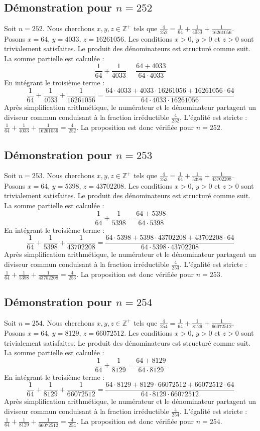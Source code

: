 \documentclass[11pt,a4paper]{article}
\begin{document}
\subsection{Démonstration pour $n = 252$}
Soit $n = 252$. Nous cherchons $x, y, z \in \mathbb{Z}^{+}$ tels que $\frac{4}{252} = \frac{1}{64} + \frac{1}{4033} + \frac{1}{16261056}$.
Posons $x = 64$, $y = 4033$, $z = 16261056$.
Les conditions $x > 0$, $y > 0$ et $z > 0$ sont trivialement satisfaites.
Le produit des dénominateurs est structuré comme suit. La somme partielle est calculée :
$$ \frac{1}{64} + \frac{1}{4033} = \frac{64+4033}{64 \cdot 4033} $$
En intégrant le troisième terme :
$$ \frac{1}{64} + \frac{1}{4033} + \frac{1}{16261056} = \frac{64 \cdot 4033 + 4033 \cdot 16261056 + 16261056 \cdot 64}{64 \cdot 4033 \cdot 16261056} $$
Après simplification arithmétique, le numérateur et le dénominateur partagent un diviseur commun conduisant à la fraction irréductible $\frac{4}{252}$.
L'égalité est stricte : $\frac{1}{64} + \frac{1}{4033} + \frac{1}{16261056} = \frac{4}{252}$.
La proposition est donc vérifiée pour $n = 252$.
\subsection{Démonstration pour $n = 253$}
Soit $n = 253$. Nous cherchons $x, y, z \in \mathbb{Z}^{+}$ tels que $\frac{4}{253} = \frac{1}{64} + \frac{1}{5398} + \frac{1}{43702208}$.
Posons $x = 64$, $y = 5398$, $z = 43702208$.
Les conditions $x > 0$, $y > 0$ et $z > 0$ sont trivialement satisfaites.
Le produit des dénominateurs est structuré comme suit. La somme partielle est calculée :
$$ \frac{1}{64} + \frac{1}{5398} = \frac{64+5398}{64 \cdot 5398} $$
En intégrant le troisième terme :
$$ \frac{1}{64} + \frac{1}{5398} + \frac{1}{43702208} = \frac{64 \cdot 5398 + 5398 \cdot 43702208 + 43702208 \cdot 64}{64 \cdot 5398 \cdot 43702208} $$
Après simplification arithmétique, le numérateur et le dénominateur partagent un diviseur commun conduisant à la fraction irréductible $\frac{4}{253}$.
L'égalité est stricte : $\frac{1}{64} + \frac{1}{5398} + \frac{1}{43702208} = \frac{4}{253}$.
La proposition est donc vérifiée pour $n = 253$.
\subsection{Démonstration pour $n = 254$}
Soit $n = 254$. Nous cherchons $x, y, z \in \mathbb{Z}^{+}$ tels que $\frac{4}{254} = \frac{1}{64} + \frac{1}{8129} + \frac{1}{66072512}$.
Posons $x = 64$, $y = 8129$, $z = 66072512$.
Les conditions $x > 0$, $y > 0$ et $z > 0$ sont trivialement satisfaites.
Le produit des dénominateurs est structuré comme suit. La somme partielle est calculée :
$$ \frac{1}{64} + \frac{1}{8129} = \frac{64+8129}{64 \cdot 8129} $$
En intégrant le troisième terme :
$$ \frac{1}{64} + \frac{1}{8129} + \frac{1}{66072512} = \frac{64 \cdot 8129 + 8129 \cdot 66072512 + 66072512 \cdot 64}{64 \cdot 8129 \cdot 66072512} $$
Après simplification arithmétique, le numérateur et le dénominateur partagent un diviseur commun conduisant à la fraction irréductible $\frac{4}{254}$.
L'égalité est stricte : $\frac{1}{64} + \frac{1}{8129} + \frac{1}{66072512} = \frac{4}{254}$.
La proposition est donc vérifiée pour $n = 254$.
\end{document}
